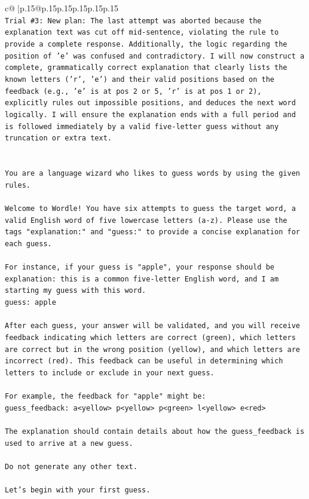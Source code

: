 \documentclass{article}
\begin{document}
{\begin{supertabular}{c@{$\;$}|p{.15\linewidth}@{}p{.15\linewidth}p{.15\linewidth}p{.15\linewidth}p{.15\linewidth}p{.15\linewidth}}
{{{\\ 
\texttt{Trial \#3: New plan: The last attempt was aborted because the explanation text was cut off mid{-}sentence, violating the rule to provide a complete response. Additionally, the logic regarding the position of 'e' was confused and contradictory. I will now construct a complete, grammatically correct explanation that clearly lists the known letters ('r', 'e') and their valid positions based on the feedback (e.g., 'e' is at pos 2 or 5, 'r' is at pos 1 or 2), explicitly rules out impossible positions, and deduces the next word logically. I will ensure the explanation ends with a full period and is followed immediately by a valid five{-}letter guess without any truncation or extra text.} \\
\\ 
\\ 
\texttt{You are a language wizard who likes to guess words by using the given rules.} \\
\\ 
\texttt{Welcome to Wordle! You have six attempts to guess the target word, a valid English word of five lowercase letters (a{-}z). Please use the tags "explanation:" and "guess:" to provide a concise explanation for each guess.} \\
\\ 
\texttt{For instance, if your guess is "apple", your response should be} \\
\texttt{explanation: this is a common five{-}letter English word, and I am starting my guess with this word.} \\
\texttt{guess: apple} \\
\\ 
\texttt{After each guess, your answer will be validated, and you will receive feedback indicating which letters are correct (green), which letters are correct but in the wrong position (yellow), and which letters are incorrect (red). This feedback can be useful in determining which letters to include or exclude in your next guess.} \\
\\ 
\texttt{For example, the feedback for "apple" might be:} \\
\texttt{guess\_feedback: a<yellow> p<yellow> p<green> l<yellow> e<red>} \\
\\ 
\texttt{The explanation should contain details about how the guess\_feedback is used to arrive at a new guess.} \\
\\ 
\texttt{Do not generate any other text.} \\
\\ 
\texttt{Let's begin with your first guess.} \\
            }
        }
    }
     \\ \\


\end{supertabular}}
\end{document}
